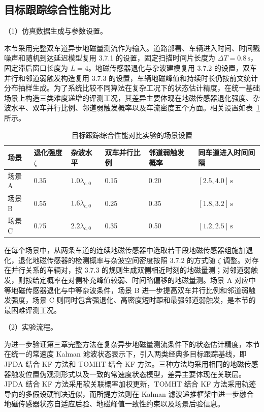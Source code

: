 \documentclass{xdupgthesis}
\begin{document}
\subsection{目标跟踪综合性能对比}

\noindent （1）仿真数据生成与参数设置。

本节采用完整双车道异步地磁量测流作为输入。道路部署、车辆进入时间、时间戳噪声和随机到达延迟模型复用 3.7.1 的设置，固定扫描时间片长度为 $\Delta T=0.8\,\mathrm{s}$，固定滞后窗口长度为 $L=4$。地磁传感器退化与杂波建模复用 3.7.2 的设置，双车并行和邻道弱触发构造复用 3.7.3 的设置，车辆地磁峰值和持续时长仍按前文统计分布抽样生成。为了系统比较不同算法在复杂工况下的状态估计精度，在统一基础场景上构造三类难度递增的评测工况，其差异主要体现在地磁传感器退化强度、杂波水平、双车并行比例、邻道弱触发概率以及车流密度五个方面。相关设置如表~\ref{tab:ch3_tracking_scene_setup} 所示。

\begin{table}[H]
	\centering
	\caption{目标跟踪综合性能对比实验的场景设置}
	\label{tab:ch3_tracking_scene_setup}
	\small
	\begin{tabular}{p{1.8cm}p{2.2cm}p{2.0cm}p{2.0cm}p{2.2cm}p{2.3cm}}
		\toprule
		场景 & 退化强度 $\zeta$ & 杂波水平 & 双车并行比例 & 邻道弱触发概率 & 同车道进入时间间隔 \\
		\midrule
		场景 A & 0.35 & $1.0\lambda_{c,0}$ & 0.15 & 0.20 & $[2.5,4.0]\,\mathrm{s}$ \\
		场景 B & 0.55 & $1.6\lambda_{c,0}$ & 0.25 & 0.35 & $[1.8,3.2]\,\mathrm{s}$ \\
		场景 C & 0.75 & $2.2\lambda_{c,0}$ & 0.35 & 0.50 & $[1.2,2.5]\,\mathrm{s}$ \\
		\bottomrule
	\end{tabular}
\end{table}

在每个场景中，从两条车道的连续地磁传感器中选取若干段地磁传感器组施加退化，退化地磁传感器的检测概率与杂波空间密度按照 3.7.2 的方式随 $\zeta$ 调整。对存在并行关系的车辆对，按 3.7.3 的规则生成双侧相近时刻的地磁量测；对邻道弱触发，则按给定概率在对侧补充峰值较弱、时间略偏移的地磁量测。场景 A 对应中等地磁传感器退化与中等杂波条件，场景 B 进一步提高双车并行比例和邻道弱触发强度，场景 C 则同时包含强退化、高密度短时距和最强邻道弱触发，是本节的最困难评测工况。

\noindent （2）实验流程。

为进一步验证第三章完整方法在复杂异步地磁量测流条件下的状态估计精度，本节在统一的常速度 Kalman 滤波状态表示下，引入两类经典多目标跟踪基线，即 JPDA 结合 KF 方法和 TOMHT 结合 KF 方法。三种方法均采用相同的地磁传感器触发位置伪观测形式以及一致的常速度状态模型，差异主要体现在关联层。JPDA 结合 KF 方法采用软关联概率加权更新，TOMHT 结合 KF 方法采用轨迹导向的多假设硬判决近似，而所提方法则在 Kalman 滤波递推框架中进一步融合地磁传感器状态自适应后验、地磁峰值一致性约束以及场景后验信息。
\end{document}
